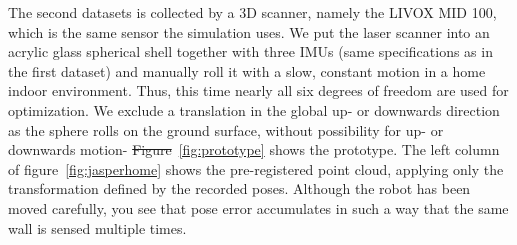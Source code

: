 \documentclass[5p]{elsarticle}
\providecommand{\DIFaddtex}[1]{{\protect\color{blue}\uwave{#1}}} %
\providecommand{\DIFdeltex}[1]{{\protect\color{red}\sout{#1}}}                      %
\providecommand{\DIFaddbegin}{} %
\providecommand{\DIFaddend}{} %
\providecommand{\DIFdelbegin}{} %
\providecommand{\DIFdelend}{} %
\providecommand{\DIFadd}[1]{\texorpdfstring{\DIFaddtex{#1}}{#1}} %
\providecommand{\DIFdel}[1]{\texorpdfstring{\DIFdeltex{#1}}{}} %
\begin{document}
The second datasets is collected by a 3D scanner, namely the LIVOX MID 100, which is the same sensor the simulation uses.
We put the laser scanner into an acrylic glass spherical shell together with three IMUs  (same specifications as in the first dataset) and manually roll it with a slow, constant motion in a home indoor environment.
Thus, this time nearly all six degrees of freedom are used for optimization.
We exclude a translation in the global up- or downwards direction as the sphere rolls on the ground surface, without possibility for up- or downwards motion-
\DIFdelbegin \DIFdel{Figure}\DIFdelend \DIFaddbegin \DIFadd{figure}\DIFaddend ~\ref{fig:prototype} shows the prototype.
The left column of figure~\ref{fig:jasperhome} shows the pre-registered point cloud, applying only the transformation defined by the recorded poses.
Although the robot has been moved carefully, you see that pose error accumulates in such a way that the same wall is sensed multiple times.   
\end{document}
